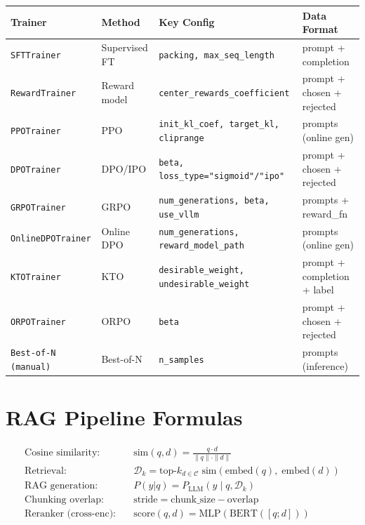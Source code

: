 \begin{tabular}{@{}lp{3.5cm}p{3.5cm}p{6cm}@{}}
\toprule
\textbf{Trainer} & \textbf{Method} & \textbf{Key Config} & \textbf{Data Format} \\
\midrule
\texttt{SFTTrainer} & Supervised FT & \texttt{packing, max\_seq\_length} & prompt + completion \\
\texttt{RewardTrainer} & Reward model & \texttt{center\_rewards\_coefficient} & prompt + chosen + rejected \\
\texttt{PPOTrainer} & PPO & \texttt{init\_kl\_coef, target\_kl, cliprange} & prompts (online gen) \\
\texttt{DPOTrainer} & DPO/IPO & \texttt{beta, loss\_type="sigmoid"/"ipo"} & prompt + chosen + rejected \\
\texttt{GRPOTrainer} & GRPO & \texttt{num\_generations, beta, use\_vllm} & prompts + reward\_fn \\
\texttt{OnlineDPOTrainer} & Online DPO & \texttt{num\_generations, reward\_model\_path} & prompts (online gen) \\
\texttt{KTOTrainer} & KTO & \texttt{desirable\_weight, undesirable\_weight} & prompt + completion + label \\
\texttt{ORPOTrainer} & ORPO & \texttt{beta} & prompt + chosen + rejected \\
\texttt{Best-of-N (manual)} & Best-of-N & \texttt{n\_samples} & prompts (inference) \\
\bottomrule
\end{tabular}

\section{RAG Pipeline Formulas}
\label{rag-pipeline-formulas}

\begin{align}
\text{Cosine similarity:}&\quad \text{sim}(q, d) = \frac{q \cdot d}{\|q\| \cdot \|d\|} \\
\text{Retrieval:}&\quad \mathcal{D}_k = \text{top-}k_{d \in \mathcal{C}} \; \text{sim}(\text{embed}(q),\; \text{embed}(d)) \\
\text{RAG generation:}&\quad P(y|q) = P_\text{LLM}(y \;|\; q, \mathcal{D}_k) \\
\text{Chunking overlap:}&\quad \text{stride} = \text{chunk\_size} - \text{overlap} \\
\text{Reranker (cross-enc):}&\quad \text{score}(q, d) = \text{MLP}(\text{BERT}([q; d]))
\end{align}

